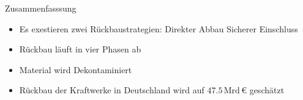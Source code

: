 \begin{frame}{Zusammenfasssung}
  \begin{itemize}
    \setlength\itemsep{1.2em}
    \item { Es exestieren zwei Rückbaustrategien:  Direkter Abbau  Sicherer Einschluss}
    \item { Rückbau läuft in vier Phasen ab }
    \item { Material wird Dekontaminiert}
    \item { Rückbau der Kraftwerke in Deutschland wird auf  $\num{47.5} \, \mathrm{Mrd} \,\euro$ geschätzt}
  \end{itemize}
\end{frame}

\begin{frame}[allowframebreaks]
  \nocite{*}
  \printbibliography
\end{frame}


